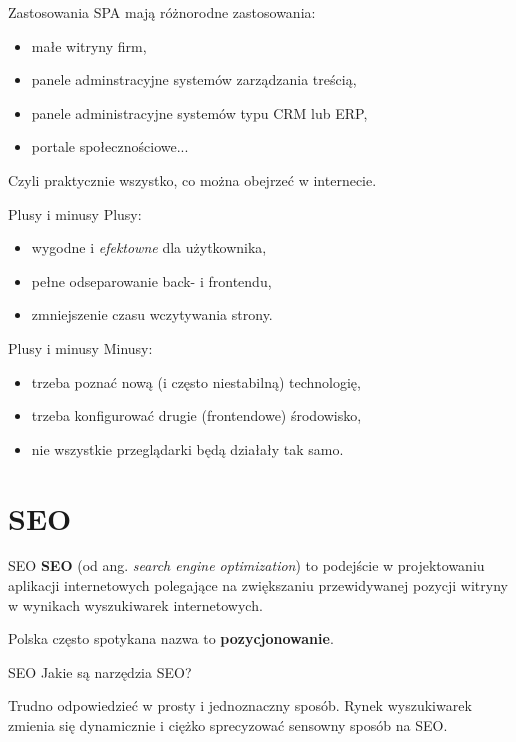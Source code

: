 \begin{frame}{Zastosowania}	
	SPA mają różnorodne zastosowania:
	\begin{itemize}
	\item małe witryny firm,
	\item panele adminstracyjne systemów zarządzania treścią,
	\item panele administracyjne systemów typu CRM lub ERP,
	\item portale społecznościowe...
	\end{itemize}
	
	Czyli praktycznie wszystko, co można obejrzeć w internecie.
\end{frame}

\begin{frame}{Plusy i minusy}
	Plusy:
	\begin{itemize}
	\item wygodne i \emph{efektowne} dla użytkownika,
	\item pełne odseparowanie back- i frontendu,
	\item zmniejszenie czasu wczytywania strony.
	\end{itemize}
\end{frame}

\begin{frame}{Plusy i minusy}
	Minusy:
	\begin{itemize}
	\item trzeba poznać nową (i często niestabilną) technologię,
	\item trzeba konfigurować drugie (frontendowe) środowisko,
	\item nie wszystkie przeglądarki będą działały tak samo.
	\end{itemize}
\end{frame}

\section{SEO}

\begin{frame}{SEO}
	\textbf{SEO} (od ang. \emph{search engine optimization}) to podejście w projektowaniu aplikacji internetowych polegające na zwiększaniu przewidywanej pozycji witryny w wynikach wyszukiwarek internetowych.
	
	Polska często spotykana nazwa to \textbf{pozycjonowanie}.
\end{frame}

\begin{frame}{SEO}
	Jakie są narzędzia SEO?
	
	Trudno odpowiedzieć w prosty i jednoznaczny sposób. Rynek wyszukiwarek zmienia się dynamicznie i ciężko sprecyzować sensowny sposób na SEO.
\end{frame}

